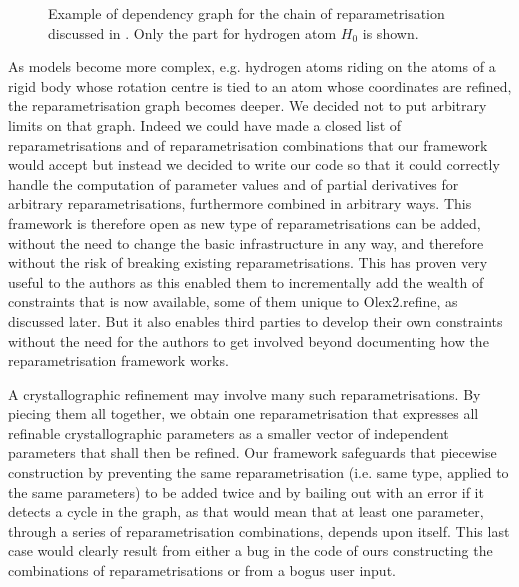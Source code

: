 \documentclass[pdf]{iucr}
\begin{document}
\begin{figure}
\label{fig:dependencegraphexample}
\caption{Example of dependency graph for the chain of reparametrisation discussed in . Only the part for hydrogen atom $H_0$ is shown.}
\end{figure}


As models become more complex, e.g. hydrogen atoms riding on the atoms of a rigid body whose rotation centre is tied to an atom whose coordinates are refined, the reparametrisation graph becomes deeper. We decided not to put arbitrary limits on that graph. Indeed we could have made a closed list of reparametrisations and of reparametrisation combinations  that our framework would accept but instead we decided to write our code so that it could correctly handle the computation of parameter values and of partial derivatives for arbitrary reparametrisations, furthermore combined in arbitrary ways. This framework is therefore open as new type of reparametrisations can be added, without the need to change the basic infrastructure in any way, and therefore without the risk of breaking existing reparametrisations. This has proven very useful to the authors as this enabled them to incrementally add the wealth of constraints that is now available, some of them unique to Olex2.refine, as discussed later. But it also enables third parties to develop their own constraints without the need for the authors to get involved beyond documenting how the reparametrisation framework works.

A crystallographic refinement may involve many such reparametrisations. By piecing them all together, we obtain one reparametrisation that expresses all refinable crystallographic parameters as a smaller vector of independent parameters that shall then be refined. Our framework safeguards that piecewise construction by preventing the same reparametrisation (i.e. same type, applied to the same parameters) to be added twice and by bailing out with an error if it detects a cycle in the graph, as that would mean that at least one parameter, through a series of reparametrisation combinations, depends upon itself. This last case would clearly result from either a bug in the code of ours constructing the combinations of reparametrisations or from a bogus user input.
\end{document}
